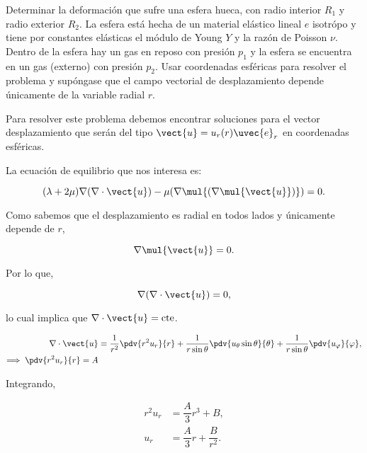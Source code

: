 \documentclass[../main.tex]{subfiles}
\begin{document}
\begin{problema}[4]
	Determinar la deformación que sufre una esfera hueca, con radio interior \(R_{1}\)
	y radio exterior \(R_{2}\). La esfera está hecha de un material elástico lineal
	\(e\) isotrópo y tiene por constantes elásticas el módulo de Young \(Y\) y la
	razón de Poisson \(\nu\). Dentro de la esfera hay un gas en reposo con presión
	\(p_{1}\) y la esfera se encuentra en un gas (externo) con presión \(p_{2}\).
	Usar coordenadas esféricas para resolver el problema y supóngase que el
	campo vectorial de desplazamiento depende únicamente de la variable radial
	\(r\).

	\startsolution

	Para resolver este problema debemos encontrar soluciones para el vector
	desplazamiento que serán del tipo \(\vect{u} = u_{r}(r)\uvec{e}_{r}\) en
	coordenadas esféricas.

	La ecuación de equilibrio que nos interesa es:

	\begin{equation*}
		(\lambda + 2\mu)\nabla{(\nabla \cdot{\vect{u}})} - \mu(\nabla \mul{(\nabla \mul{\vect{u}})}) = 0.
	\end{equation*}

	Como sabemos que el desplazamiento es radial en todos lados y únicamente depende de \(r\),

	\begin{equation*}
		\nabla \mul{\vect{u}} = 0.
	\end{equation*}

	Por lo que,

	\begin{equation*}
		\nabla{(\nabla \cdot{\vect{u}})} = 0,
	\end{equation*}

	lo cual implica que \(\nabla \cdot{\vect{u}} = \text{cte}\).

	\begin{align*}
		\nabla \cdot{\vect{u}} & = \dfrac{1}{r^{2}}\pdv{r^{2}u_{r}}{r} + \dfrac{1}{r\sin\theta}\pdv{u_{\theta}\sin\theta}{\theta} + \dfrac{1}{r\sin\theta}\pdv{u_{\varphi}}{\varphi}, \\
		\Longrightarrow\;\pdv{r^{2}u_{r}}{r} = A
	\end{align*}

	Integrando,

	\begin{align}
		r^{2}u_{r} & = \dfrac{A}{3}r^{3} + B,\nonumber                \\
		u_{r}      & = \dfrac{A}{3}r + \dfrac{B}{r^{2}}.\label{eq:ur}
	\end{align}


\end{problema}
\end{document}
